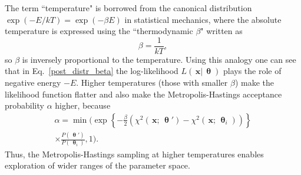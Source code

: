 \documentclass[preprint2]{aastex}
\newcommand{\bfx}{\,\mathbf{x}}
\newcommand{\bfth}{\,\bm{\uptheta}}
\begin{document}
The term ``temperature" is borrowed from the canonical distribution $\exp \left( -E/{kT} \right) = \exp \left( -\beta E \right)$ in statistical mechanics, where the absolute temperature is expressed using the ``thermodynamic $\beta$" written as 
\begin{equation}
	\beta = \frac{1}{kT},
\end{equation}
so $\beta$ is inversely proportional to the temperature. Using this analogy one can see that in Eq.~\eqref{post_distr_beta}  the log-likelihood $L(\bfx|\bfth)$ plays the role of negative energy $-E$. Higher temperatures (those with smaller $\beta$) make the likelihood function flatter and also make the Metropolis-Hastings acceptance probability $\alpha$ higher, because
\begin{eqnarray}
  \label{accept_probab_beta}
  \alpha = \min \biggl( \exp \left\lbrace -\frac{\beta}{2}\left( \chi^2(\bfx;\bfth') - \chi^2(\bfx;\bfth_i) \right)
              \right\rbrace \nonumber \\
         \times  \frac{P(\bfth')} {P(\bfth_i)}, 1 \biggr).  
\end{eqnarray}
Thus, the Metropolis-Hastings sampling at higher temperatures enables exploration of wider ranges of the parameter space. 
\end{document}
